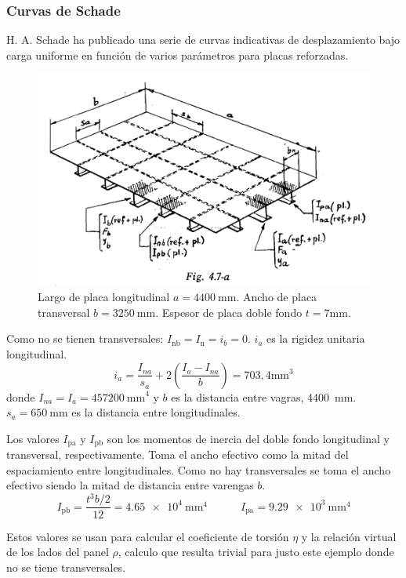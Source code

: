 \documentclass[onecolumn,10pt,titlepage]{article}
\begin{document}
\subsubsection*{Curvas de Schade}
H. A. Schade ha publicado una serie de curvas indicativas de desplazamiento bajo carga uniforme en función de varios parámetros para placas reforzadas.
\begin{figure}[htb!]
	\centering
	\includegraphics[draft,width=.7\textwidth]{fig/placaschade.png}
	\caption{Largo de placa longitudinal $a=\SI{4400}{\milli \meter}$. Ancho de placa transversal $b=\SI{3250}{\milli\meter}$. Espesor de placa doble fondo $t=7\si{\milli \meter}$.}
	\label{fig:placaschade}
\end{figure}

Como no se tienen transversales: $I_{\mathrm{nb}}=I_{\mathrm{n}}=i_b=0$. $i_a$ es la rigidez unitaria longitudinal.
\[
i_{a}=\frac{I_{n a}}{s_{a}}+2\left(\frac{I_{a}-I_{n a}}{b}\right)=703,4\si{\milli \meter^3}
\]
donde $I_{na}=I_{a}=\SI{457200}{\milli \meter }^4$ y $b$ es la distancia entre vagras, \SI{4400}{\milli \meter}. $s_a=\SI{650}{\milli \meter}$ es la distancia entre longitudinales.


Los valores  $I_{\mathrm{pa}}$ y $I_{\mathrm{pb}}$ son los momentos de inercia del doble fondo longitudinal y transversal, respectivamente. Toma el ancho efectivo como la mitad del espaciamiento entre longitudinales. Como no hay transversales se toma el ancho efectivo siendo la mitad de distancia entre varengas $b$. 
\[
I_{\mathrm{pb}}= \frac{t^3 b/2}{12} = \SI{4,65e4}{\milli \meter^4}
\qquad\quad I_{\mathrm{pa}}= \SI{9,29e3}{\milli\meter^4}
\]

Estos valores se usan para calcular el coeficiente de torsión $\eta$ y la relación virtual de los lados del panel $\rho$, calculo que resulta trivial para justo este ejemplo donde no se tiene transversales.
\end{document}
